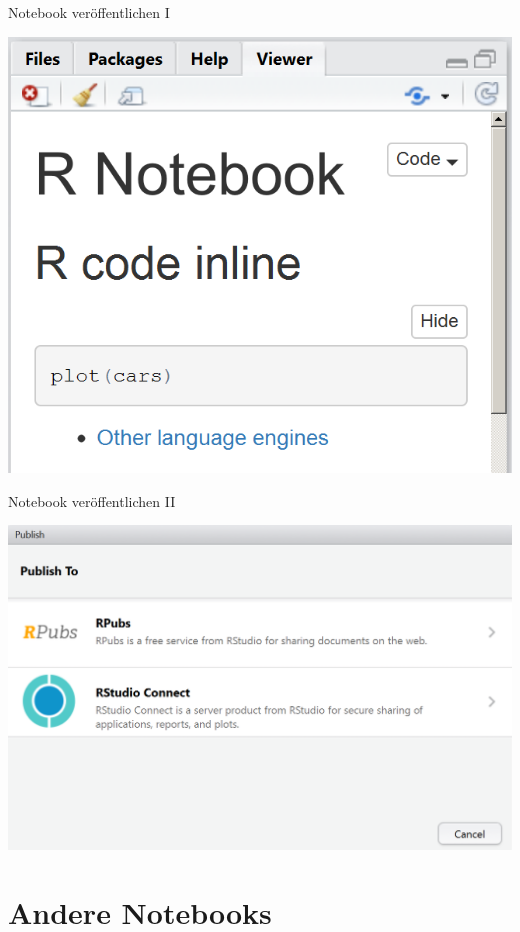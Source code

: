 \documentclass[ignorenonframetext,]{beamer}
\begin{document}
\begin{frame}{Notebook veröffentlichen I}

\includegraphics{./tex2pdf.956/5b1dbc0c68b69060d1ae94848af5547ad7c4a4fb.png}

\end{frame}

\begin{frame}{Notebook veröffentlichen II}

\includegraphics{./tex2pdf.956/28365916615ed13366e94545603bcd4b86271ee9.png}

\end{frame}

\section{Andere Notebooks}\label{andere-notebooks}
\end{document}
